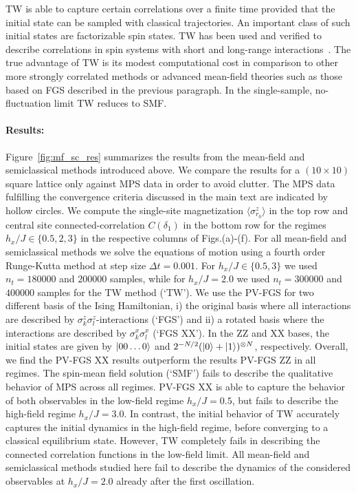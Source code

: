 \documentclass[aps,pra,reprint,amssymb,superscriptaddress]{revtex4-2}
\begin{document}
TW is able to capture certain correlations over a finite time provided that the initial state can be sampled with classical trajectories. An important class of such initial states are factorizable spin states. TW has been used and verified to describe correlations in spin systems with short and long-range interactions~\cite{perlin_spin_2020}. The true advantage of TW is its modest computational cost in comparison to other more strongly correlated methods or advanced mean-field theories such as those based on FGS described in the previous paragraph. In the single-sample, no-fluctuation limit TW reduces to SMF.

\paragraph{Results:} Figure~\ref{fig:mf_sc_res} summarizes the results from the mean-field and semiclassical methods introduced above. We compare the results for a $(10\times 10)$ square lattice only against MPS data in order to avoid clutter. The MPS data fulfilling the convergence criteria discussed in the main text are indicated by hollow circles. We compute the single-site magnetization $\langle\sigma^z_{r_0}\rangle$ in the top row and central site connected-correlation $C(\delta_1)$ in the bottom row for the regimes $h_x/J\in \{0.5, 2, 3\}$ in the respective columns of Figs.(a)-(f). For all mean-field and semiclassical methods we solve the equations of motion using a fourth order Runge-Kutta method at step size $\Delta t=0.001$. For $h_x/J\in \{0.5, 3\}$ we used $n_t=180000$ and $200000$ samples, while for $h_x/J=2.0$ we used $n_t=300000$ and $400000$ samples for the TW method (`TW'). We use the PV-FGS for two different basis of the Ising Hamiltonian, i) the original basis where all interactions are described by  $\sigma^z_k\sigma^z_l$-interactions (`FGS') and ii) a rotated basis where the interactions are described by $\sigma^x_k\sigma^x_l$ (`FGS XX'). In the ZZ and XX bases, the initial states are given by $\ket{00\dots 0}$ and $2^{-N/2}(\ket{0}+\ket{1})^{\otimes N}$, respectively. Overall, we find the PV-FGS XX results outperform the results PV-FGS ZZ in all regimes.  The spin-mean field solution (`SMF') fails to describe the qualitative behavior of MPS across all regimes. PV-FGS XX is able to capture the behavior of both observables in the low-field regime $h_x/J=0.5$, but fails to describe the high-field regime $h_x/J=3.0$. In contrast, the initial behavior of TW accurately captures the initial dynamics in the high-field regime, before converging to a classical equilibrium state. However, TW completely fails in describing the connected correlation functions in the low-field limit. All mean-field and semiclassical methods studied here fail to describe the dynamics of the considered observables  at $h_x/J=2.0$ already after the first oscillation. 


\end{document}

